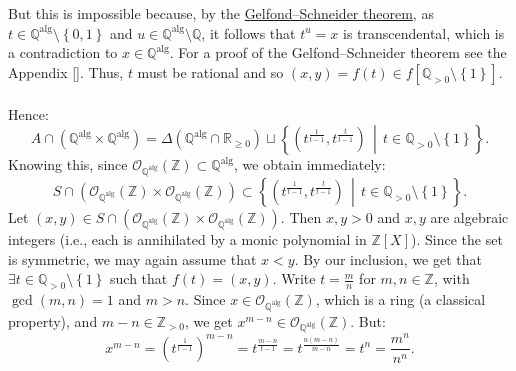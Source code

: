 \begin{solution}
    \\\\
    But this is impossible because, by the \href{https://en.wikipedia.org/wiki/Gelfond–Schneider_theorem}{Gelfond–Schneider theorem}, as \( t \in \mathbb{Q}^{\mathrm{alg}} \setminus \left\{0,1\right\} \) and \( u \in \mathbb{Q}^{\mathrm{alg}} \setminus \mathbb{Q} \), it follows that \( t^{u} = x \) is transcendental, which is a contradiction to \( x \in \mathbb{Q}^{\mathrm{alg}} \). For a proof of the Gelfond–Schneider theorem see the Appendix []. Thus, \( t \) must be rational and so \( \left(x, y\right) = f\left(t\right) \in f\left[ \mathbb{Q}_{>0} \setminus \left\{1\right\} \right] \).
    \\\\
    Hence:
    \[
        A \cap \left( \mathbb{Q}^{\mathrm{alg}} \times \mathbb{Q}^{\mathrm{alg}} \right) = \Delta\left( \mathbb{Q}^{\mathrm{alg}} \cap \mathbb{R}_{\geq 0} \right) \sqcup \left\{ \left( t^{\frac{1}{t - 1}}, t^{\frac{t}{t - 1}} \right) \,\middle|\, t \in \mathbb{Q}_{>0} \setminus \left\{ 1 \right\} \right\}.
    \]
    Knowing this, since \( \mathcal{O}_{\mathbb{Q}^{\mathrm{alg}}}\left(\mathbb{Z}\right) \subset \mathbb{Q}^{\mathrm{alg}} \), we obtain immediately:
    \[
        S \cap \left( \mathcal{O}_{\mathbb{Q}^{\mathrm{alg}}}\left(\mathbb{Z}\right) \times \mathcal{O}_{\mathbb{Q}^{\mathrm{alg}}}\left(\mathbb{Z}\right) \right) \subset \left\{ \left( t^{\frac{1}{t - 1}}, t^{\frac{t}{t - 1}} \right) \,\middle|\, t \in \mathbb{Q}_{>0} \setminus \left\{ 1 \right\} \right\}.
    \]
    Let \( \left(x,y\right) \in S \cap \left( \mathcal{O}_{\mathbb{Q}^{\mathrm{alg}}}\left(\mathbb{Z}\right) \times \mathcal{O}_{\mathbb{Q}^{\mathrm{alg}}}\left(\mathbb{Z}\right) \right) \). Then \( x,y > 0 \) and \( x,y \) are algebraic integers (i.e., each is annihilated by a monic polynomial in \( \mathbb{Z}\left[X\right] \)). Since the set is symmetric, we may again assume that \( x < y \). By our inclusion, we get that \( \exists t \in \mathbb{Q}_{>0} \setminus \left\{ 1 \right\} \) such that \( f\left(t\right) = \left(x, y\right) \). Write \( t = \frac{m}{n} \) for \( m,n \in \mathbb{Z} \), with \( \gcd\left(m,n\right) = 1 \) and \( m > n \). Since \( x \in \mathcal{O}_{\mathbb{Q}^{\mathrm{alg}}}\left(\mathbb{Z}\right) \), which is a ring (a classical property), and \( m - n \in \mathbb{Z}_{>0} \), we get \( x^{m-n} \in \mathcal{O}_{\mathbb{Q}^{\mathrm{alg}}}\left(\mathbb{Z}\right) \). But:
    \[
        x^{m-n} = \left( t^{\frac{1}{t-1}} \right)^{m-n} = t^{\frac{m-n}{t-1}} = t^{\frac{n\left(m-n\right)}{m-n}} = t^{n} = \frac{m^{n}}{n^{n}}.
\]
\end{solution}
